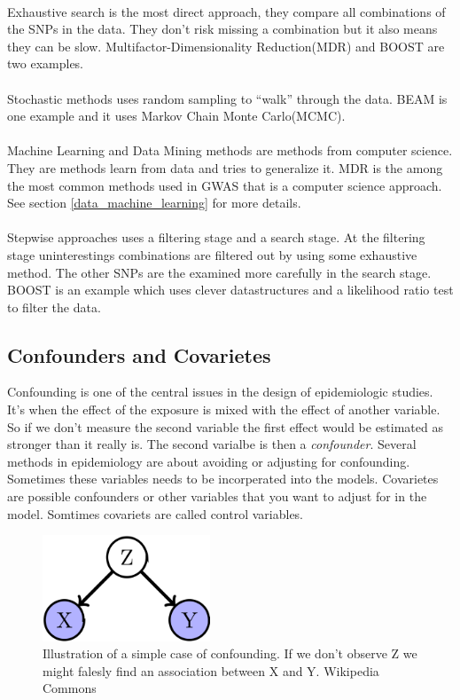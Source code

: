 \documentclass[10pt,a4paper]{article}
\begin{document}
\\
Exhaustive search is the most direct approach, they compare all combinations of the SNPs in the data. They don't risk missing a combination but it also means they can be slow. Multifactor-Dimensionality Reduction(MDR)\cite{mdr_2001} and BOOST\cite{boost_gene_gene} are two examples.\\
\\
Stochastic methods uses random sampling to ``walk'' through the data. BEAM\cite{beam_2007} is one example and it uses Markov Chain Monte Carlo(MCMC).\\
\\
Machine Learning and Data Mining methods are methods from computer science. They are methods learn from data and tries to generalize it. MDR\cite{mdr_2001} is the among the most common methods used in GWAS that is a computer science approach. See section \ref{data_machine_learning} for more details.\\
\\
Stepwise approaches uses a filtering stage and a search stage. At the filtering stage uninterestings combinations are filtered out by using some exhaustive method. The other SNPs are the examined more carefully in the search stage. BOOST\cite{boost_gene_gene} is an example which uses clever datastructures and a likelihood ratio test to filter the data.

\subsection{Confounders and Covarietes}
Confounding is one of the central issues in the design of epidemiologic studies. It's when the effect of the exposure is mixed with the effect of another variable. So if we don't measure the second variable the first effect would be estimated as stronger than it really is. The second varialbe is then a \emph{confounder}. Several methods in epidemiology are about avoiding or adjusting for confounding. Sometimes these variables needs to be incorperated into the models. Covarietes are possible confounders or other variables that you want to adjust for in the model. Somtimes covariets are called control variables.\cite{rothman2002intro_epidemiology,rothman1998modern}

\begin{figure}[h]
    \centering
    \includegraphics[width=5cm]{Simple_Confounding_Case.png}
    \caption{Illustration of a simple case of confounding. If we don't observe Z we might falesly find an association between X and Y. Wikipedia Commons}
    \label{fig:confunding}
\end{figure}
\end{document}
